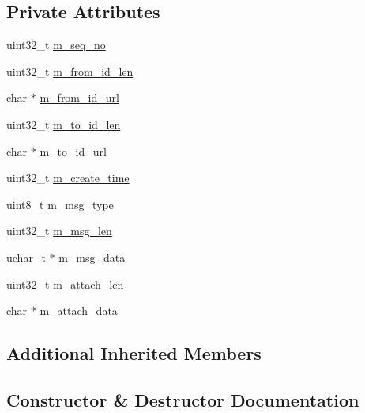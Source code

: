 \subsection*{Private Attributes}
\begin{DoxyCompactItemize}
\item 
uint32\+\_\+t \hyperlink{class_c_im_pdu_client_msg_data_a2eb1e220425ed3af78f7ea7806286ef2}{m\+\_\+seq\+\_\+no}
\item 
uint32\+\_\+t \hyperlink{class_c_im_pdu_client_msg_data_ab498533f19ebc1d83efca62a49c8da4f}{m\+\_\+from\+\_\+id\+\_\+len}
\item 
char $\ast$ \hyperlink{class_c_im_pdu_client_msg_data_ada59f9aa8ae94f2e77780446f33e0b2a}{m\+\_\+from\+\_\+id\+\_\+url}
\item 
uint32\+\_\+t \hyperlink{class_c_im_pdu_client_msg_data_a47d7a192cc2705e5a15e8ba08715cf27}{m\+\_\+to\+\_\+id\+\_\+len}
\item 
char $\ast$ \hyperlink{class_c_im_pdu_client_msg_data_a59bcf473a08e7ed29909f3590228d82d}{m\+\_\+to\+\_\+id\+\_\+url}
\item 
uint32\+\_\+t \hyperlink{class_c_im_pdu_client_msg_data_a248b09aff201e8dd4ccba32fd11b3b27}{m\+\_\+create\+\_\+time}
\item 
uint8\+\_\+t \hyperlink{class_c_im_pdu_client_msg_data_a844427c694178b641b2c2713a1edad5c}{m\+\_\+msg\+\_\+type}
\item 
uint32\+\_\+t \hyperlink{class_c_im_pdu_client_msg_data_acabde8e08641972fa32fa69829afb920}{m\+\_\+msg\+\_\+len}
\item 
\hyperlink{base_2ostype_8h_a124ea0f8f4a23a0a286b5582137f0b8d}{uchar\+\_\+t} $\ast$ \hyperlink{class_c_im_pdu_client_msg_data_a8f806f54923c824216f4359bc4199c31}{m\+\_\+msg\+\_\+data}
\item 
uint32\+\_\+t \hyperlink{class_c_im_pdu_client_msg_data_a351b2b60b9fc9c3bc8522dac9871e531}{m\+\_\+attach\+\_\+len}
\item 
char $\ast$ \hyperlink{class_c_im_pdu_client_msg_data_ab485963fdcdfd376bf7b2445de414659}{m\+\_\+attach\+\_\+data}
\end{DoxyCompactItemize}
\subsection*{Additional Inherited Members}


\subsection{Constructor \& Destructor Documentation}
\hypertarget{class_c_im_pdu_client_msg_data_a26020af0c039fd38941edeb0b06f6798}{}
